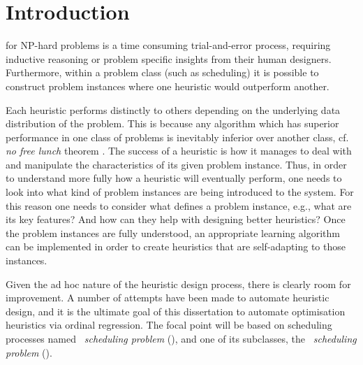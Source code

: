 
\chapter{Introduction}\label{ch:introduction} 

 for NP-hard problems is a time 
consuming trial-and-error process, requiring inductive reasoning or problem 
specific insights from their human designers. Furthermore, within a problem 
class (such as scheduling) it is possible to construct problem instances where 
one heuristic would outperform another. 

Each heuristic performs distinctly to others depending on the underlying data 
distribution of the problem. This is because any algorithm which 
has superior performance in one class of problems is inevitably inferior over 
another class, cf. \emph{no free lunch} theorem \citep{Wolpert97nofree}. 
The success of a heuristic is how it manages to deal with and manipulate the 
characteristics of its given problem instance. Thus, in order to understand 
more fully how a heuristic will eventually perform, one needs to look into what 
kind of problem instances are being introduced to the system. 
For this reason one needs to consider what defines a 
problem instance, e.g., what are its key features? And how can they help with 
designing better heuristics? Once the problem instances are fully understood, 
an appropriate learning algorithm can be implemented in order to create 
heuristics that are  self-adapting to those instances.

Given the ad hoc nature of the heuristic design process, there is clearly room 
for improvement. A number of attempts have been made to automate heuristic 
design, and it is the ultimate goal of this dissertation to automate 
optimisation heuristics via ordinal regression. 
The focal point will be based on scheduling processes named \emph{\jsp\ 
scheduling problem} (\JSP), and one of its subclasses, the \emph{\fsp\ 
scheduling problem} (\FSP).


